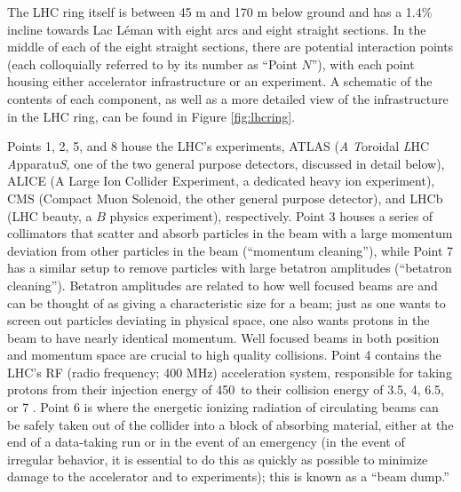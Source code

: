   The LHC ring itself is between 45 m and 170 m below ground and has a 1.4\% incline towards Lac L\'eman with eight arcs and eight straight sections.  In the middle of each of the eight straight sections, there are potential interaction points (each colloquially referred to by its number as ``Point $N$''), with each point housing either accelerator infrastructure or an experiment.  A schematic of the contents of each component, as well as a more detailed view of the infrastructure in the LHC ring, can be found in Figure \ref{fig:lhcring}.

\begin{landscape}
\begin{figure}[!htbp]\captionsetup{justification=centering}
  \centering
  \begin{subfigure}[t]{0.4950000\linewidth}\centering\texttt{[image: figures/atlas/lhcschematic]}}\caption{}\end{subfigure}
  \begin{subfigure}[t]{0.4950000\linewidth}\centering\texttt{[image: figures/atlas/fig\_LHC\_area\_overview]}}\caption{}\end{subfigure}
  \caption{Schematic and detailed views of the LHC ring. IC: \cite{lhccartoon}, \cite{lhcdetail}}
  \label{fig:lhcring}
\end{figure}
\end{landscape}

Points 1, 2, 5, and 8 house the LHC's experiments, ATLAS (\emph{A} \emph{T}oroidal \emph{L}HC \emph{A}pparatu\emph{S}, one of the two general purpose detectors, discussed in detail below), ALICE (A Large Ion Collider Experiment, a dedicated heavy ion experiment), CMS (Compact Muon Solenoid, the other general purpose detector), and LHCb (LHC beauty, a $B$ physics experiment), respectively.  Point 3 houses a series of collimators that scatter and absorb particles in the beam with a large momentum deviation from other particles in the beam (``momentum cleaning''), while Point 7 has a similar setup to remove particles with large betatron amplitudes (``betatron cleaning'').  Betatron amplitudes are related to how well focused beams are and can be thought of as giving a characteristic size for a beam; just as one wants to screen out particles deviating in physical space, one also wants protons in the beam to have nearly identical  momentum.  Well focused beams in both position and momentum space are crucial to high quality collisions.  Point 4 contains the LHC's RF (radio frequency; 400 MHz) acceleration system, responsible for taking protons from their injection energy of 450 \GeV\,to their collision energy of 3.5, 4, 6.5, or 7 \TeV.  Point 6 is where the energetic ionizing radiation of circulating beams can be safely taken out of the collider into a block of absorbing material, either at the end of a data-taking run or in the event of an emergency (in the event of irregular behavior, it is essential to do this as quickly as possible to minimize damage to the accelerator and to experiments); this is known as a ``beam dump.''

